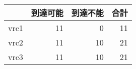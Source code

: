 \begin{tabular}{l|rrr} 
  & 到達可能 & 到達不能 & 合計 \\ \hline
  vrc1 & 11 & 0 & 11 \\
  vrc2 & 11 & 10 & 21 \\
  vrc3 & 11 & 10 & 21 \\
\end{tabular}